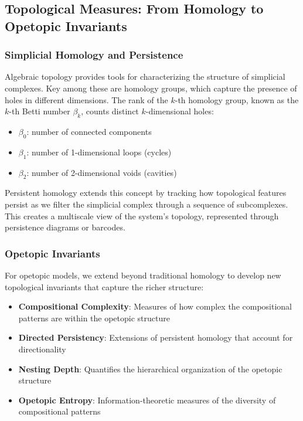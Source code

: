 \subsection{Topological Measures: From Homology to Opetopic Invariants}
\subsubsection{Simplicial Homology and Persistence}
Algebraic topology provides tools for characterizing the structure of simplicial complexes. Key among these are homology groups, which capture the presence of holes in different dimensions. The rank of the $k$-th homology group, known as the $k$-th Betti number $\beta_k$, counts distinct $k$-dimensional holes:
\begin{itemize}
    \item $\beta_0$: number of connected components
    \item $\beta_1$: number of 1-dimensional loops (cycles)
    \item $\beta_2$: number of 2-dimensional voids (cavities)
\end{itemize}

Persistent homology extends this concept by tracking how topological features persist as we filter the simplicial complex through a sequence of subcomplexes. This creates a multiscale view of the system's topology, represented through persistence diagrams or barcodes.

\subsubsection{Opetopic Invariants}
For opetopic models, we extend beyond traditional homology to develop new topological invariants that capture the richer structure:

\begin{itemize}
    \item \textbf{Compositional Complexity}: Measures of how complex the compositional patterns are within the opetopic structure
    \item \textbf{Directed Persistency}: Extensions of persistent homology that account for directionality
    \item \textbf{Nesting Depth}: Quantifies the hierarchical organization of the opetopic structure
    \item \textbf{Opetopic Entropy}: Information-theoretic measures of the diversity of compositional patterns
\end{itemize}

